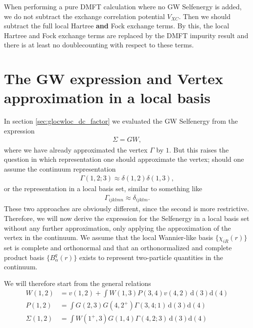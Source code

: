 \documentclass[12pt,a4paper]{scrartcl}
\numberwithin{equation}{section}
\begin{document}
When performing a pure DMFT calculation where no GW Selfenergy is added,
we do not subtract the exchange correlation potential $V_{XC}$.
Then we should subtract the full local Hartree \textbf{and} Fock exchange terms.
By this, the local Hartree and Fock exchange terms are replaced by the DMFT impurity
result and there is at least no doublecounting with respect to these terms. 



\clearpage 

\section{The GW expression and Vertex approximation in a local basis}
In section \ref{sec:glocwloc_dc_factor} we evaluated the GW Selfenergy
from the expression 
\begin{align}
 \Sigma = GW,
\end{align}
where we have already approximated the vertex $\Gamma$ by $1$.
But this raises the question in which representation one should approximate
the vertex; should one assume the continuum representation
\begin{align}
 \Gamma(1,2;3) \approx  \delta(1,2)\delta(1,3),
\end{align}
or the representation in a local basis set, similar to something like
\begin{align}
 \Gamma_{ijklmn} \approx  \delta_{ijklm} .
\end{align}
These two approaches are obviously different, since the second is more restrictive.
Therefore, we will now derive the expression for the Selfenergy
in a local basis set without any further approximation, only
applying the approximation of the vertex in the continuum.
We assume that the local Wannier-like basis $\{ \chi_{iR}(r) \}$ set is complete 
and orthonormal 
and that an orthonormalized and complete product basis $\{ B^q_\alpha(r) \}$
exists to represent two-particle quantities in the continuum.

We will therefore start from the general relations
\begin{align}
W(1,2)
 &= v(1,2)
  + \int  W(1,3) P(3,4) v(4,2) \, \mathrm{d}(3)\mathrm{d}(4) \label{eq:w_continuum} \\
%
P(1,2) &= \int G(2,3)G(4,2^+) \Gamma(3,4;1) \, \mathrm{d}(3)\mathrm{d}(4) \\
%
\Sigma(1,2)
&= \int W(1^+,3) G(1,4) \Gamma(4,2;3) \, \mathrm{d}(3)\mathrm{d}(4)
\end{align}
\end{document}

